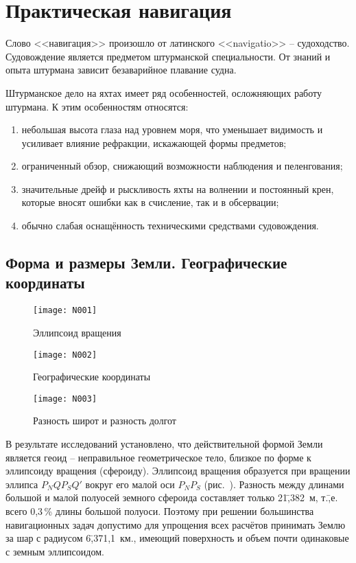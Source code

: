 \chapter{Практическая навигация}\label{chap:6}

Слово <<навигация>> произошло от латинского <<navigatio>> \---
судоходство. Судовождение является предметом штурманской
специальности. От знаний и опыта штурмана зависит безаварийное
плавание судна.

Штурманское дело на яхтах имеет ряд особенностей, осложняющих работу
штурмана. К этим особенностям относятся:
\begin{enumerate}
\item небольшая высота глаза над уровнем моря, что уменьшает видимость
  и усиливает влияние рефракции, искажающей формы предметов;
\item ограниченный обзор, снижающий возможности наблюдения и
  пеленгования;
\item значительные дрейф и рыскливость яхты на волнении и постоянный
  крен, которые вносят ошибки как в счисление, так и в обсервации;
\item обычно слабая оснащённость техническими средствами судовождения. 
\end{enumerate}

\section{Форма и размеры Земли. Географические координаты} 

\begin{figure}[htb]
  \centering{}
  \texttt{[image: N001]}
  \caption{Эллипсоид вращения}
  \label{fig:N1}
\end{figure}

\begin{figure}[htb]
  \centering{}
  \texttt{[image: N002]}
  \caption{Географические координаты}
  \label{fig:N2}
\end{figure}

\begin{figure*}[htb]
  \centering{}
  \texttt{[image: N003]}
  \caption{Разность широт и разность долгот}
  \label{fig:N3}
\end{figure*}

В результате исследований установлено, что действительной формой Земли
является геоид \--- неправильное геометрическое тело, близкое по форме
к эллипсоиду вращения (сфероиду). Эллипсоид вращения образуется при
вращении эллипса $P_NQP_SQ'$ вокруг его малой оси $P_NP_S$
(рис.~). Разность между длинами большой и малой полуосей
земного сфероида составляет только 21\=,382~м, т.\=,е. всего 0,3\,\%
длины большой полуоси. Поэтому при решении большинства навигационных
задач допустимо для упрощения всех расчётов принимать Землю за шар с
радиусом 6\=,371,1~км., имеющий поверхность и объем почти одинаковые с
земным эллипсоидом.

